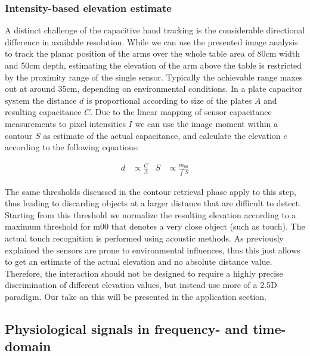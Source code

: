 \subsubsection{Intensity-based elevation estimate}
A distinct challenge of the capacitive hand tracking is the considerable directional difference in available resolution. While we can use the presented image analysis to track the planar position of the arms over the whole table area of 80cm width and 50cm depth, estimating the elevation of the arm above the table is restricted by the proximity range of the single sensor. Typically the achievable range maxes out at around 35cm, depending on environmental conditions. In a plate capacitor system the distance $d$ is proportional according to size of the plates $A$ and resulting capacitance $C$. Due to the linear mapping of sensor capacitance measurements to pixel intensities $I$ we can use the image moment within a contour $S$ as estimate of the actual capacitance, and calculate the elevation $e$ according to the following equations:

\begin{align}
d&\propto{\tfrac{C}{A}} & S&\propto{\tfrac{m_{00}}{\int{S}}}
\end{align}

The same thresholds discussed in the contour retrieval phase apply to this step, thus leading to discarding objects at a larger distance that are difficult to detect. Starting from this threshold we normalize the resulting elevation according to a maximum threshold for m00 that denotes a very close object (such as touch). The actual touch recognition is performed using acoustic methods. 
As previously explained the sensors are prone to environmental influences, thus this just allows to get an estimate of the actual elevation and no absolute distance value. Therefore, the interaction should not be designed to require a highly precise discrimination of different elevation values, but instead use more of a 2.5D paradigm. Our take on this will be presented in the application section.

\subsection{Physiological signals in frequency- and time-domain}
